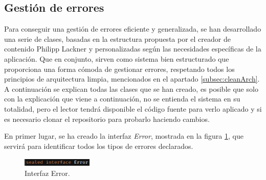 \subsection{Gestión de errores} 
Para conseguir una gestión de errores eficiente y generalizada, se han desarrollado una serie de clases, basadas en la estructura propuesta por el creador de contenido Philipp Lackner\hyperlink{cap:biblio}{} y personalizadas según las necesidades específicas de la aplicación. Que en conjunto, sirven como sistema bien estructurado que proporciona una forma cómoda de gestionar errores, respetando todos los principios de arquitectura limpia, mencionados en el apartado \ref{subsec:cleanArch}. A continuación se explican todas las clases que se han creado, es posible que solo con la explicación que viene a continuación, no se entienda el sistema en su totalidad, pero el lector tendrá disponible el código fuente para verlo aplicado y si es necesario clonar el repositorio para probarlo haciendo cambios.

En primer lugar, se ha creado la interfaz \textit{Error}, mostrada en la figura \ref{fig:error_interface}, que servirá para identificar todos los tipos de errores declarados.
\begin{figure}[h]
    \centering
    \includegraphics[width = 0.3\textwidth]{Imagenes/Fuentes/error_interface.png}
    \caption{Interfaz Error.}
    \label{fig:error_interface}
\end{figure}

